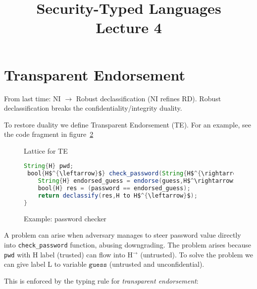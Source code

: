 \documentclass{article}
\title{Security-Typed Languages \\ \Large{Lecture 4}}
\newcommand{\la}{^{\leftarrow}}
\newcommand{\ra}{^{\rightarrow}}
\begin{document}
\maketitle

\section{Transparent Endorsement}

From last time: NI $\rightarrow$ Robust declassification (NI refines RD). Robust declassification breaks the confidentiality/integrity duality.

To restore duality  we define
Transparent Endorsement (TE). For an example, see the code fragment in figure~\ref{code1}
\begin{figure}[ht!]
\label{fig1}
\caption{Lattice for TE}
\end{figure}

\begin{figure}
\begin{lstlisting}[mathescape,frame=single,basicstyle=\ttfamily,language=java]
String{H} pwd;
 bool{H$^{\leftarrow}$} check_password(String{H$^{\rightarrow}$} guess) {
    String{H} endorsed_guess = endorse(guess,H$^\rightarrow$ to H);
    bool{H} res = (password == endorsed_guess);
    return declassify(res,H to H$^{\leftarrow}$);
}
\end{lstlisting}
\label{code1}
\caption{Example: password checker}
\end{figure}

A problem can arise when adversary manages to steer password value directly into \texttt{check\_password} function, abusing downgrading. The problem arises because \texttt{pwd} with H label (trusted) can flow into H$^{\rightarrow}$ (untrusted). To solve the problem we can give label L to variable $\texttt{guess}$ (untrusted and unconfidential).

This is enforced by the typing  rule for \emph{transparent endorsement}:
\end{document}
